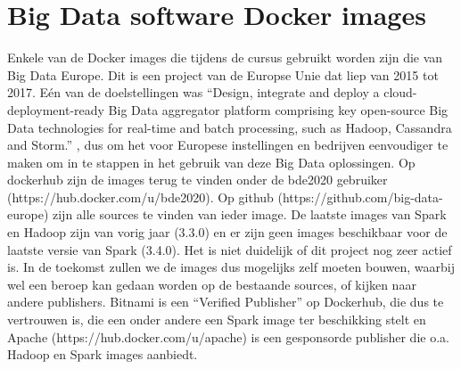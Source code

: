 \section{Big Data software Docker images}
Enkele van de Docker images die tijdens de cursus gebruikt worden zijn die van Big Data Europe. Dit is een project van de Europse Unie dat liep van 2015 tot 2017.
Eén van de doelstellingen was ``Design, integrate and deploy a cloud-deployment-ready Big Data aggregator platform comprising key open-source Big Data technologies for real-time and batch processing, such as Hadoop, Cassandra and Storm.'' \textcite{Commission2022}, dus om het voor Europese instellingen en bedrijven eenvoudiger te maken om in te stappen in het gebruik van deze Big Data oplossingen.
\newline
Op dockerhub zijn de images terug te vinden onder de bde2020 gebruiker (https://hub.docker.com/u/bde2020). Op github (https://github.com/big-data-europe) zijn alle sources te vinden van ieder image.
\newline
De laatste images van Spark en Hadoop zijn van vorig jaar (3.3.0) en er zijn geen images beschikbaar voor de laatste versie van Spark (3.4.0). Het is niet duidelijk of dit project nog zeer actief is. In de toekomst zullen we de images dus mogelijks zelf moeten bouwen, waarbij wel een beroep kan gedaan worden op de bestaande sources, of kijken naar andere publishers.
\newline
Bitnami is een ``Verified Publisher'' op Dockerhub, die dus te vertrouwen is, die een onder andere een Spark image ter beschikking stelt en Apache (https://hub.docker.com/u/apache) is een gesponsorde publisher die o.a. Hadoop en Spark images aanbiedt.


